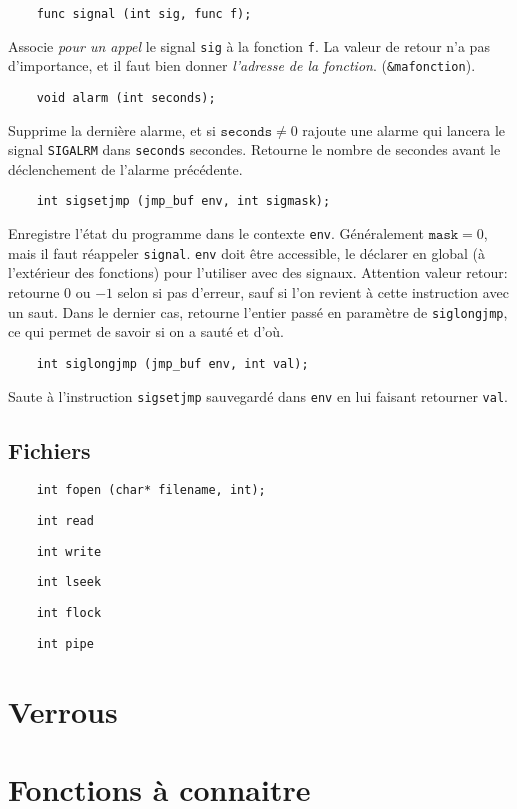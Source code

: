 \documentclass[10pt,twocolumn,a4paper]{article}
\begin{document}
\begin{lstlisting}
    func signal (int sig, func f);
\end{lstlisting}
Associe \emph{pour un appel} le signal \texttt{sig} à la fonction \texttt{f}.
La valeur de retour n'a pas d'importance, et il faut bien donner \emph{l'adresse de la fonction}.
(\texttt{\&mafonction}).

\begin{lstlisting}
    void alarm (int seconds);
\end{lstlisting}
Supprime la dernière alarme, et si $\texttt{seconds} \neq 0$ rajoute une alarme qui lancera le signal \texttt{SIGALRM} dans \texttt{seconds} secondes.
Retourne le nombre de secondes avant le déclenchement de l'alarme précédente.

\begin{lstlisting}
    int sigsetjmp (jmp_buf env, int sigmask);
\end{lstlisting}
Enregistre l'état du programme dans le contexte \texttt{env}. Généralement $\texttt{mask} = 0$, mais il faut réappeler \texttt{signal}.
\texttt{env} doit être accessible, le déclarer en global (à l'extérieur des fonctions) pour l'utiliser avec des signaux.
Attention valeur retour: retourne $0$ ou $-1$ selon si pas d'erreur, sauf si l'on revient à cette instruction avec un saut.
Dans le dernier cas, retourne l'entier passé en paramètre de \texttt{siglongjmp}, ce qui permet de savoir si on a sauté et d'où.

\begin{lstlisting}
    int siglongjmp (jmp_buf env, int val);
\end{lstlisting}
Saute à l'instruction \texttt{sigsetjmp} sauvegardé dans \texttt{env} en lui faisant retourner \texttt{val}.

\subsection{Fichiers}

\begin{lstlisting}
    int fopen (char* filename, int);
\end{lstlisting}

\begin{lstlisting}
    int read
\end{lstlisting}

\begin{lstlisting}
    int write
\end{lstlisting}

\begin{lstlisting}
    int lseek
\end{lstlisting}

\begin{lstlisting}
    int flock
\end{lstlisting}

\begin{lstlisting}
    int pipe
\end{lstlisting}








\section{Verrous}

\section{Fonctions à connaitre}
\end{document}
